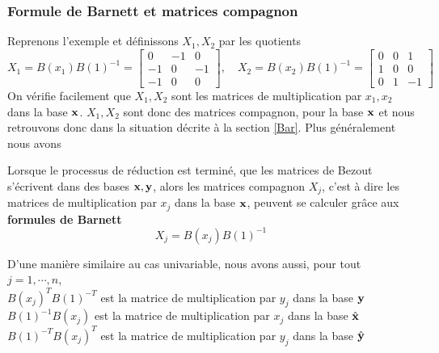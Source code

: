 \documentclass{standalone}
\begin{document}
\subsubsection{Formule de Barnett et matrices compagnon}
Reprenons l'exemple \label{ex_bez_multi} et définissons $X_1, X_2$ par les quotients
\begin{equation}
	X_1 = B(x_1)B(1)^{-1} =
	\begin{bmatrix}
		0 & -1 & 0\\
		-1 & 0 & -1\\
		-1 & 0 & 0
	\end{bmatrix},\quad
	X_2 = B(x_2)B(1)^{-1} =
	\begin{bmatrix}
		0 & 0 & 1\\
		1 & 0 & 0\\
		0 & 1 & -1
	\end{bmatrix}
\end{equation}
On vérifie facilement que $X_1, X_2$ sont les matrices de multiplication par $x_1, x_2$ dans la base $\bold{x}$. $X_1, X_2$ sont donc des matrices compagnon, pour la base $\bold{x}$ et nous retrouvons donc dans la situation décrite à la section \ref{Bar}. Plus généralement nous avons
\begin{prop}
\label{Barnett_multi}
Lorsque le processus de réduction est terminé, que les matrices de Bezout s'écrivent dans des bases $\bold{x, y}$, alors les matrices compagnon $X_j$, c'est à dire les matrices de multiplication par $x_j$ dans la base $\bold{x}$, peuvent se calculer grâce aux {\bf formules de Barnett}
\begin{equation}
	X_j = B(x_j)B(1)^{-1}
\end{equation}
\end{prop}

\begin{rem}
D'une manière similaire au cas univariable, nous avons aussi, pour tout $j=1,\cdots,n$,\\
$B(x_j)^{T}B(1)^{-T}$ est la matrice de multiplication par $y_j$ dans la base $\bold{y}$ \\
$B(1)^{-1}B(x_j)$ est la matrice de multiplication par $x_j$ dans la base $\hat{\bold{x}}$ \\
$B(1)^{-T}B(x_j)^{T}$ est la matrice de multiplication par $y_j$ dans la base $\hat{\bold{y}}$
\end{rem}
\end{document}
